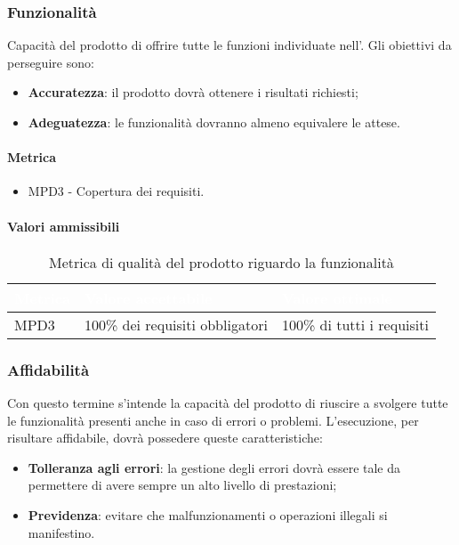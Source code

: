 \subsubsection{Funzionalità}
Capacità del prodotto di offrire tutte le funzioni individuate nell'\AdRv{}. Gli obiettivi da perseguire sono:
\begin{itemize}
\item \textbf{Accuratezza}: il prodotto dovrà ottenere i risultati richiesti;
\item \textbf{Adeguatezza}: le funzionalità dovranno almeno equivalere le attese.
\end{itemize}
\paragraph{Metrica}
\begin{itemize}
\item MPD3 - Copertura dei requisiti.
\end{itemize}
\paragraph{Valori ammissibili}
\renewcommand{\arraystretch}{1.5}
\begin{longtable}{C{2.5cm} C{4cm} C{4cm}}
\textcolor{white}{\textbf{Metrica}}&
\textcolor{white}{\textbf{Valore accettabile}}&
\textcolor{white}{\textbf{Valore ottimale}}\\	
\endhead
\endfoot
{}\caption{Metrica di qualità del prodotto riguardo la funzionalità}
\endlastfoot
		MPD3 & 
		100\% dei requisiti obbligatori &
		100\% di tutti i requisiti \\
\end{longtable}
\subsubsection{Affidabilità}
Con questo termine s'intende la capacità del prodotto di riuscire a svolgere tutte le funzionalità presenti anche in caso di errori o problemi. L'esecuzione, per risultare affidabile, dovrà possedere queste caratteristiche:
\begin{itemize}
\item \textbf{Tolleranza agli errori}: la gestione degli errori dovrà essere tale da permettere di avere sempre un alto livello di prestazioni;
\item \textbf{Previdenza}: evitare che malfunzionamenti o operazioni illegali si manifestino.
\end{itemize}
